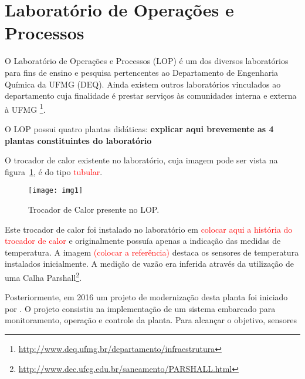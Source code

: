 \section{Laboratório de Operações e Processos}
	O Laboratório de Operações e Processos (LOP) é um dos diversos laboratórios para fins de ensino e pesquisa pertencentes ao Departamento de Engenharia Química da UFMG (DEQ). Ainda existem outros laboratórios vinculados ao departamento cuja finalidade é prestar serviços às comunidades interna e externa à UFMG \footnote{\url{http://www.deq.ufmg.br/departamento/infraestrutura}}.
	
	O LOP possui quatro plantas didáticas: \textbf{explicar aqui brevemente as 4 plantas constituintes do laboratório}
	
	O trocador de calor existente no laboratório, cuja imagem pode ser vista na figura~\ref{img1}, é do tipo \textcolor{red}{tubular}. 
	
	\begin{figure}[!htb]
		\centering
		\texttt{[image: img1]}  %
		\caption{Trocador de Calor presente no LOP.}
		\label{img1}
	\end{figure}

	Este trocador de calor foi instalado no laboratório em \textcolor{red}{colocar aqui a história do trocador de calor} e originalmente possuía apenas a indicação das medidas de temperatura. A imagem \textcolor{red}{(colocar a referência)} destaca os sensores de temperatura instalados inicialmente. A medição de vazão era inferida através da utilização de uma Calha Parshall\footnote{\url{http://www.dec.ufcg.edu.br/saneamento/PARSHALL.html}}.
		
	Posteriormente, em 2016 um projeto de modernização desta planta foi iniciado por \cite{luiz2016}.  O projeto consistiu na implementação de um sistema embarcado para monitoramento, operação e controle da planta. Para alcançar o objetivo, sensores 